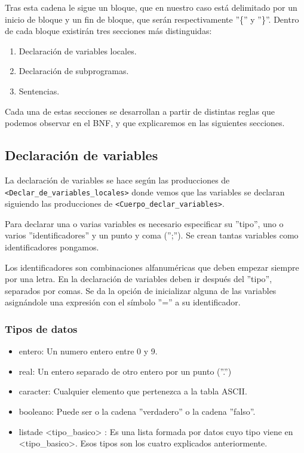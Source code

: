 \documentclass[12pt, spanish]{article}
\begin{document}
Tras esta cadena le sigue un bloque, que en nuestro caso está delimitado por un inicio de bloque y un fin de bloque, que serán respectivamente ''\{'' y ''\}''. Dentro de cada bloque existirán tres secciones más distinguidas:

\begin{enumerate}
	\item Declaración de variables locales.
	\item Declaración de subprogramas.
	\item Sentencias.
\end{enumerate}

Cada una de estas secciones se desarrollan a partir de distintas reglas que podemos observar en el BNF, y que explicaremos en las siguientes secciones.

\subsection{Declaración de variables}

La declaración de variables se hace según las producciones de \texttt{<Declar_de_variables_locales>} donde vemos que las variables se declaran siguiendo las producciones de \texttt{<Cuerpo_declar_variables>}.


Para declarar una o varias variables es necesario especificar su ''tipo'', uno o varios ''identificadores'' y un punto y coma ('';''). Se crean tantas variables como identificadores pongamos.


Los identificadores son combinaciones alfanuméricas que deben empezar siempre por una letra. En la declaración de variables deben ir después del ''tipo'', separados por comas. Se da la opción de inicializar alguna de las variables asignándole una expresión con el símbolo ''='' a su identificador.

\subsubsection{Tipos de datos}

\begin{itemize}

	\item entero: Un numero entero entre 0 y 9.
	\item real: Un entero separado de otro entero por un punto (''.'')
	\item caracter: Cualquier elemento que pertenezca a la tabla ASCII.
	\item booleano: Puede ser o la cadena ''verdadero'' o la cadena ''falso''.
	\item listade <tipo_basico> : Es una lista formada por datos cuyo tipo viene en <tipo_basico>. Esos tipos son los cuatro explicados anteriormente.
\end{itemize}
\end{document}
